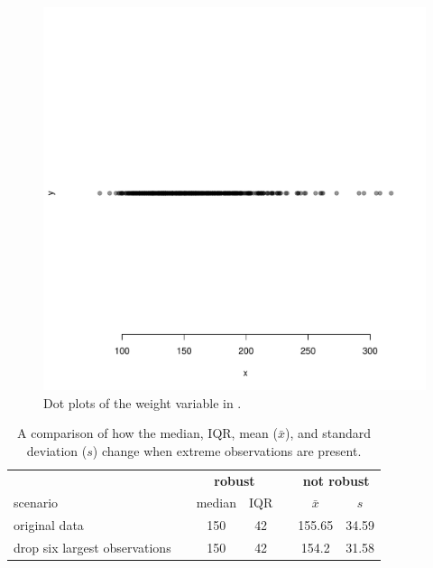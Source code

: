 \begin{doublespace}
\begin{figure}[ht]
	\centering
	\includegraphics[width=\textwidth]{ch_intro_to_data_oi_biostat/figures/famussWeightDotPlotRobustEx/famussWeightDotPlotRobustEx}
	\caption{Dot plots of the weight variable in .}
	\label{famussWeightDotPlotRobustEx}
\end{figure}

\begin{table}[ht]
	\centering
	\begin{tabular}{l c cc c cc}
		\hline
		& \hspace{0mm} & \multicolumn{2}{c}{\bf robust} & \hspace{2mm} & \multicolumn{2}{c}{\bf not robust} \\
		scenario && median & IQR && $\bar{x}$ & $s$ \\ 
		\hline
		original \var{weight} data 	&& 150 & 42 && 155.65 & 34.59 \\
		drop six largest observations && 150 & 42 && 154.2 & 31.58 \\
		
		\hline
	\end{tabular}
	\caption{A comparison of how the median, IQR, mean ($\bar{x}$), and standard deviation ($s$) change when extreme observations are present.}
	\label{robustOrNotTable}
\end{table}


\end{doublespace}
